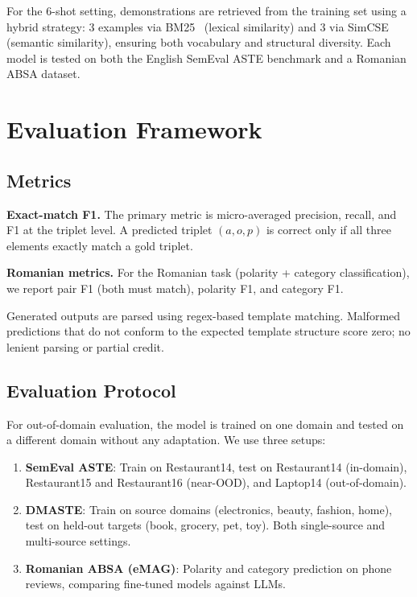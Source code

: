 \documentclass[12pt,a4paper]{report}
\begin{document}
For the 6-shot setting, demonstrations are retrieved from the training set using a hybrid strategy: 3 examples via BM25~\cite{robertson2009bm25} (lexical similarity) and 3 via SimCSE~\cite{gao2021simcse} (semantic similarity), ensuring both vocabulary and structural diversity. Each model is tested on both the English SemEval ASTE benchmark and a Romanian ABSA dataset.


\section{Evaluation Framework}\label{sec:evaluation}

\subsection{Metrics}

\textbf{Exact-match F1.} The primary metric is micro-averaged precision, recall, and F1 at the triplet level. A predicted triplet $(a, o, p)$ is correct only if all three elements exactly match a gold triplet.

\textbf{Romanian metrics.} For the Romanian task (polarity + category classification), we report pair F1 (both must match), polarity F1, and category F1.

Generated outputs are parsed using regex-based template matching. Malformed predictions that do not conform to the expected template structure score zero; no lenient parsing or partial credit.

\subsection{Evaluation Protocol}

For out-of-domain evaluation, the model is trained on one domain and tested on a different domain without any adaptation. We use three setups:

\begin{enumerate}
    \item \textbf{SemEval ASTE}: Train on Restaurant14, test on Restaurant14 (in-domain), Restaurant15 and Restaurant16 (near-OOD), and Laptop14 (out-of-domain).
    \item \textbf{DMASTE}: Train on source domains (electronics, beauty, fashion, home), test on held-out targets (book, grocery, pet, toy). Both single-source and multi-source settings.
    \item \textbf{Romanian ABSA (eMAG)}: Polarity and category prediction on phone reviews, comparing fine-tuned models against LLMs.
\end{enumerate}
\end{document}
